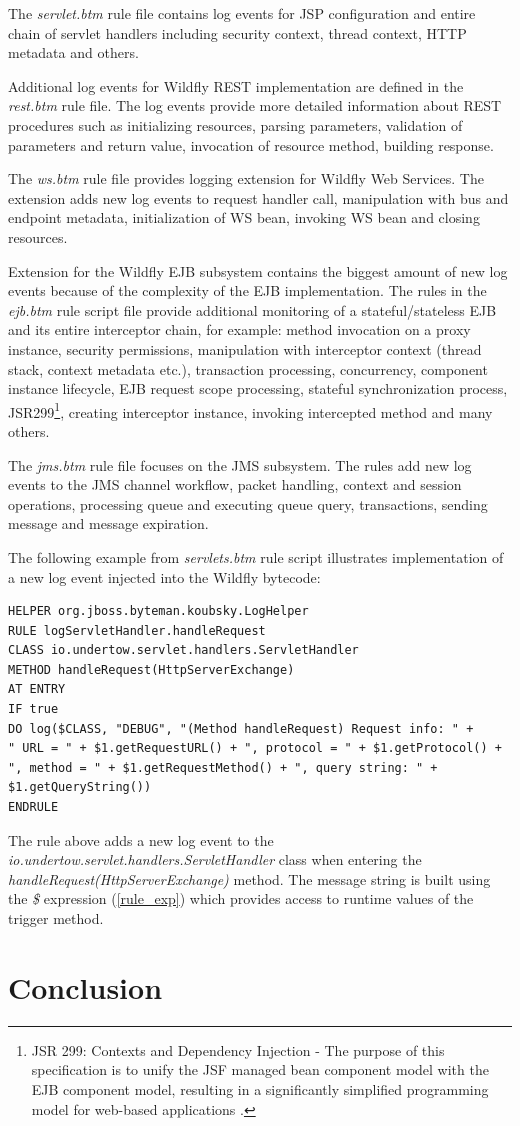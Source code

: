 \documentclass[12pt,oneside]{fithesis2}
\begin{document}
The \textit{servlet.btm} rule file contains log events for JSP configuration and entire chain of servlet handlers including security context, thread context, HTTP metadata and others.

Additional log events for Wildfly REST implementation are defined in the \textit{rest.btm} rule file. The log events provide more detailed information about REST procedures such as initializing resources, parsing parameters, validation of parameters and return value, invocation of resource method, building response.

The \textit{ws.btm} rule file provides logging extension for Wildfly Web Services. The extension adds new log events to request handler call, manipulation with bus and endpoint metadata, initialization of WS bean, invoking WS bean and closing resources.

Extension for the Wildfly EJB subsystem contains the biggest amount of new log events because of the complexity of the EJB implementation. The rules in the \textit{ejb.btm} rule script file provide additional monitoring of a stateful/stateless EJB and its entire interceptor chain, for example: method invocation on a proxy instance, security permissions, manipulation with interceptor context (thread stack, context metadata etc.), transaction processing, concurrency, component instance lifecycle, EJB request scope processing, stateful synchronization process, JSR299\footnote{JSR 299: Contexts and Dependency Injection - The purpose of this specification is to unify the JSF managed bean component model with the EJB component model, resulting in a significantly simplified programming model for web-based applications \cite{jsr299}.}, creating interceptor instance, invoking intercepted method and many others.

The \textit{jms.btm} rule file focuses on the JMS subsystem. The rules add new log events to the JMS channel workflow, packet handling, context and session operations, processing queue and executing queue query, transactions, sending message and message expiration.

The following example from \textit{servlets.btm} rule script illustrates implementation of a new log event injected into the Wildfly bytecode:
\begin{lstlisting}[caption = An example of the rule implementation for a new log event, label = rule_log_example]
HELPER org.jboss.byteman.koubsky.LogHelper
RULE logServletHandler.handleRequest
CLASS io.undertow.servlet.handlers.ServletHandler
METHOD handleRequest(HttpServerExchange)
AT ENTRY
IF true
DO log($CLASS, "DEBUG", "(Method handleRequest) Request info: " + 
" URL = " + $1.getRequestURL() + ", protocol = " + $1.getProtocol() + 
", method = " + $1.getRequestMethod() + ", query string: " + $1.getQueryString())
ENDRULE
\end{lstlisting}
\noindent
The rule above adds a new log event to the \textit{io.undertow.servlet.handlers.ServletHandler} class when entering the \textit{handleRequest(HttpServerExchange)} method. The message string is built using the \textit{\$} expression (\ref{rule_exp}) which provides access to runtime values of the trigger method.

\chapter{Conclusion}
\label{conclusion}



\end{document}
